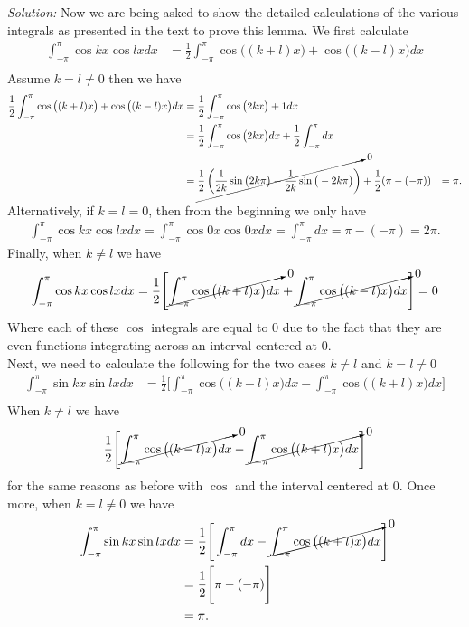 \documentclass[10pt]{amsart}
\theoremstyle{nonumberplain}
\begin{document}
\begin{enumerate}[label={\bf {\arabic*}:}]
\noindent
\textit{Solution:} Now we are being asked to show the detailed calculations of the various integrals as presented in the text to prove this lemma.
We first calculate
\begin{align*}
\int_{-\pi}^{\pi} \cos kx \cos l x dx
	&= \frac 1 2 \int_{-\pi}^{\pi} \cos \big( (k + l) x\big) + \cos \big( (k - l) x\big) dx \\
\end{align*}
Assume $k = l \neq 0$ then we have
\begin{align*}
\frac 1 2 \int_{-\pi}^{\pi} \cos \big( (k + l) x\big) + \cos \big( (k - l) x\big) dx 
	&= \frac 1 2 \int_{-\pi}^{\pi} \cos \big( 2k x\big) + 1 dx \\
	&= \frac 1 2 \int_{-\pi}^{\pi} \cos \big( 2k x\big) dx + \frac 1 2 \int_{-\pi}^{\pi} dx \\
	&= \cancelto{0}{\frac 1 2 \left( \frac 1 {2k} \sin\big( 2k \pi\big) - \frac 1 {2k} \sin\big( - 2k \pi\big) \right) }+ \frac 1 2( \pi - (-\pi) )
	&= \pi.
\end{align*}
Alternatively, if $k = l = 0$, then from the beginning we only have
\begin{align*}
\int_{-\pi}^{\pi} \cos kx \cos l x dx = \int_{-\pi}^{\pi} \cos 0x \cos 0 x dx = \int_{-\pi}^{\pi} dx = \pi - (-\pi) = 2\pi.
\end{align*}
Finally, when $k \neq l$ we have
\begin{align*}
\int_{-\pi}^{\pi} \cos kx \cos l x dx
	&= \frac 1 2 \Bigg[ \cancelto{0}{\int_{-\pi}^{\pi} \cos \big( (k + l) x\big)dx} + \cancelto{0}{\int_{-\pi}^{\pi} \cos \big( (k - l) x\big) dx} \Bigg] = 0 \\
\end{align*}
Where each of these $\cos$ integrals are equal to 0 due to the fact that they are even functions integrating across an interval centered at 0. \\

\noindent
Next, we need to calculate the following for the two cases $k \neq l$ and $k = l \neq 0$
\begin{align*}
\int_{-\pi}^{\pi} \sin kx \sin l x dx
	&= \frac 1 2 \Bigg[ \int_{-\pi}^{\pi} \cos \big( (k - l) x\big)dx - \int_{-\pi}^{\pi} \cos \big( (k + l) x\big) dx \Bigg] \\
\end{align*}
When $k \neq l$ we have
\begin{align*}
\frac 1 2 \Bigg[ \cancelto{0}{\int_{-\pi}^{\pi} \cos \big( (k - l) x\big)dx} - \cancelto{0}{\int_{-\pi}^{\pi} \cos \big( (k + l) x\big) dx} \Bigg] \\
\end{align*}
for the same reasons as before with $\cos$ and the interval centered at 0.
Once more, when $k = l \neq 0$ we have
\begin{align*}
\int_{-\pi}^{\pi} \sin kx \sin l x dx
	&= \frac 1 2 \Bigg[ \int_{-\pi}^{\pi} dx - \cancelto{0}{\int_{-\pi}^{\pi} \cos \big( (k + l) x\big) dx} \Bigg] \\
	&= \frac 1 2 \Bigg[ \pi - (-\pi) \Bigg] \\
	&= \pi.
\end{align*}


\end{enumerate}
\end{document}
